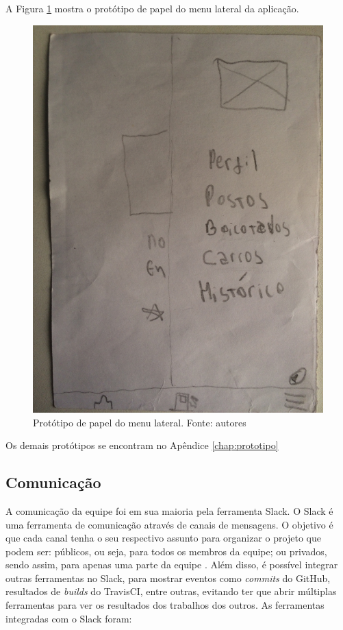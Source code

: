 A Figura \ref{img:prototipo_de_papel_menu_lateral} mostra o protótipo de papel do menu lateral da aplicação.
\begin{figure}[H]
    \centering
    \includegraphics[scale=0.1, angle=-90]{figuras/prototipo_papel_menu.jpg}
    \caption[Protótipo de papel do menu lateral]{Protótipo de papel do menu lateral. Fonte: autores}
    \label{img:prototipo_de_papel_menu_lateral}
\end{figure}
 \pagebreak

Os demais protótipos se encontram no Apêndice \ref{chap:prototipo}

\subsection{Comunicação}

A comunicação da equipe foi em sua maioria pela ferramenta Slack. O Slack é uma ferramenta de comunicação através de canais de mensagens. O objetivo é que cada canal tenha o seu respectivo assunto para organizar o projeto que podem ser: públicos, ou seja, para todos os membros da equipe; ou privados, sendo assim, para apenas uma parte da equipe \cite{slack}. Além disso, é possível integrar outras ferramentas no Slack, para mostrar eventos como \textit{commits} do GitHub, resultados de \textit{builds} do TravisCI, entre outras, evitando ter que abrir múltiplas ferramentas para ver os resultados dos trabalhos dos outros. As ferramentas integradas com o Slack foram:

